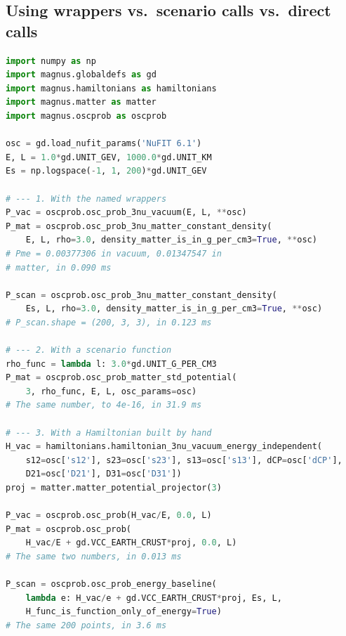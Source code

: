 \subsection{Using wrappers vs.~scenario calls vs.~direct calls}
\label{sec:wrapper_vs_direct}

\begin{lstlisting}[language=Python, caption={\textbf{Vacuum and constant density, three ways.} The three-flavor probability, computed three ways. The wrappers take the oscillation parameters as keywords, here the NuFIT 6.1 values, and the density in g~cm$^{-3}$. The scenario function takes the density as a function of position. The hand-built form is the vacuum term divided by the energy plus the potential $V_{\rm CC}$ times the projector of \equ{h_matter}; {\tt VCC\_EARTH\_CRUST} is that potential at 3~g~cm$^{-3}$ and $Y_e = 1/2$. All three return the same probabilities; the times are measured under the protocol of Sec.~\ref{sec:timing_protocol}. See Sec.~\ref{sec:wrapper_vs_direct} for details.}, label={lst:constant}, float=tbp]
import numpy as np
import magnus.globaldefs as gd
import magnus.hamiltonians as hamiltonians
import magnus.matter as matter
import magnus.oscprob as oscprob

osc = gd.load_nufit_params('NuFIT 6.1')
E, L = 1.0*gd.UNIT_GEV, 1000.0*gd.UNIT_KM
Es = np.logspace(-1, 1, 200)*gd.UNIT_GEV

# --- 1. With the named wrappers
P_vac = oscprob.osc_prob_3nu_vacuum(E, L, **osc)
P_mat = oscprob.osc_prob_3nu_matter_constant_density(
    E, L, rho=3.0, density_matter_is_in_g_per_cm3=True, **osc)
# Pme = 0.00377306 in vacuum, 0.01347547 in
# matter, in 0.090 ms

P_scan = oscprob.osc_prob_3nu_matter_constant_density(
    Es, L, rho=3.0, density_matter_is_in_g_per_cm3=True, **osc)
# P_scan.shape = (200, 3, 3), in 0.123 ms

# --- 2. With a scenario function
rho_func = lambda l: 3.0*gd.UNIT_G_PER_CM3
P_mat = oscprob.osc_prob_matter_std_potential(
    3, rho_func, E, L, osc_params=osc)
# The same number, to 4e-16, in 31.9 ms

# --- 3. With a Hamiltonian built by hand
H_vac = hamiltonians.hamiltonian_3nu_vacuum_energy_independent(
    s12=osc['s12'], s23=osc['s23'], s13=osc['s13'], dCP=osc['dCP'],
    D21=osc['D21'], D31=osc['D31'])
proj = matter.matter_potential_projector(3)

P_vac = oscprob.osc_prob(H_vac/E, 0.0, L)
P_mat = oscprob.osc_prob(
    H_vac/E + gd.VCC_EARTH_CRUST*proj, 0.0, L)
# The same two numbers, in 0.013 ms

P_scan = oscprob.osc_prob_energy_baseline(
    lambda e: H_vac/e + gd.VCC_EARTH_CRUST*proj, Es, L,
    H_func_is_function_only_of_energy=True)
# The same 200 points, in 3.6 ms
\end{lstlisting}

